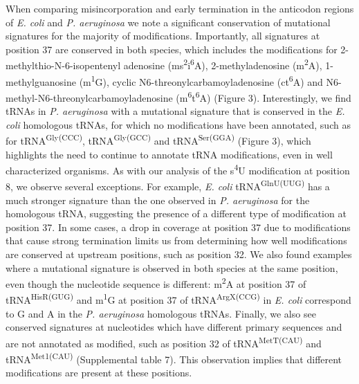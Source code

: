 \documentclass[times, twoside]{zHenriquesLab-StyleBioRxiv}
\begin{document}
When comparing misincorporation and early termination in the anticodon regions of \textit{E. coli} and \textit{P. aeruginosa} we note a significant conservation of mutational signatures for the majority of modifications. Importantly, all signatures at position 37 are conserved in both species, which includes the modifications for 2-methylthio-N-6-isopentenyl adenosine (ms\textsuperscript{2}i\textsuperscript{6}A), 2-methyladenosine (m\textsuperscript{2}A), 1-methylguanosine (m\textsuperscript{1}G), cyclic N6-threonylcarbamoyladenosine (ct\textsuperscript{6}A) and N6-methyl-N6-threonylcarbamoyladenosine (m\textsuperscript{6}t\textsuperscript{6}A) (Figure 3). Interestingly, we find tRNAs in \textit{P. aeruginosa} with a mutational signature that is conserved in the \textit{E. coli} homologous tRNAs, for which no modifications have been annotated, such as for tRNA\textsuperscript{Gly(CCC)}, tRNA\textsuperscript{Gly(GCC)} and tRNA\textsuperscript{Ser(GGA)} (Figure 3), which highlights the need to continue to annotate tRNA modifications, even in well characterized organisms. As with our analysis of the s\textsuperscript{4}U modification at position 8, we observe several exceptions. For example, \textit{E. coli} tRNA\textsuperscript{GlnU(UUG)} has a much stronger signature than the one observed in \textit{P. aeruginosa} for the homologous tRNA, suggesting the presence of a different type of modification at position 37. In some cases, a drop in  coverage at position 37 due to modifications that cause strong termination limits us from determining how well modifications are conserved at upstream positions, such as position 32. We also found examples where a mutational signature is observed in both species at the same position, even though the nucleotide sequence is different:  m\textsuperscript{2}A at position 37 of tRNA\textsuperscript{HisR(GUG)} and m\textsuperscript{1}G at position 37 of tRNA\textsuperscript{ArgX(CCG)} in \textit{E. coli} correspond to G and A in the \textit{P. aeruginosa} homologous tRNAs. Finally, we also see conserved signatures at nucleotides which have different primary sequences and are not annotated as modified, such as position 32 of tRNA\textsuperscript{MetT(CAU)} and tRNA\textsuperscript{Met1(CAU)} (Supplemental table 7). This observation implies that different modifications are present at these positions. 
\end{document}

